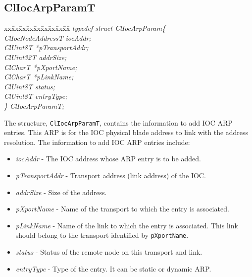 \begin{flushleft}
\subsection{ClIocArpParamT}
\begin{tabbing}
 xx\=xx\=xx\=xx\=xx\=xx\=xx\=xx\=xx\=\kill
 \textit{typedef struct ClIocArpParam\{}\\
 \>\>\>\>\textit{ClIocNodeAddressT iocAddr;}\\
 \>\>\>\>\textit{ClUint8T *pTransportAddr;}\\
 \>\>\>\>\textit{ClUint32T addrSize;}\\
 \>\>\>\>\textit{ClCharT *pXportName;}\\
 \>\>\>\>\textit{ClCharT *pLinkName;}\\
 \>\>\>\>\textit{ClUint8T status;}\\
 \>\>\>\>\textit{ClUint8T entryType;}\\
 \textit{\} ClIocArpParamT;}\end{tabbing}
 The structure, {\tt{ClIocArpParamT}}, contains the information to add IOC ARP entries. This ARP is for the IOC physical blade
 address to link with the address resolution. The information to add IOC ARP entries include:
 \begin{itemize}
 \item
 \textit{iocAddr} - The IOC address whose ARP entry is to be added.
\item
 \textit{pTransportAddr} - Transport address (link address) of the IOC.
\item
 \textit{addrSize} - Size of the address.
\item
 \textit{pXportName} - Name of the transport to which the entry is associated.
\item
 \textit{pLinkName} - Name of the link to which the entry is associated. This link should
     belong to the transport identified by {\tt{pXportName}}.
\item
 \textit{status} - Status of the remote node on this transport and link.

\item
 \textit{entryType} - Type of the entry. It can be static or dynamic ARP.
 
 \end{itemize} 





\end{flushleft}
